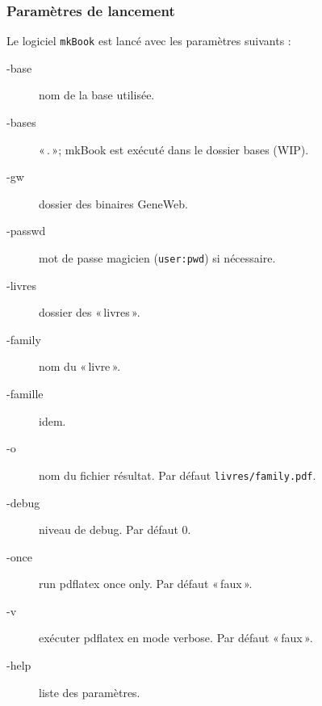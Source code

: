 \subsubsection{Paramètres de lancement}

Le logiciel \verb|mkBook| est lancé avec les paramètres suivants :
\begin{description}
\item[-base] nom de la base utilisée.
\item[-bases] «\,.\,»; mkBook est exécuté dans le dossier bases (WIP).
\item[-gw] dossier des binaires GeneWeb.
\item[-passwd] mot de passe magicien (\verb|user:pwd|) si nécessaire.
\item[-livres] dossier des «\,livres\,».
\item[-family] nom du «\,livre\,».
\item[-famille] idem.
\item[-o] nom du fichier résultat. Par défaut \verb|livres/family.pdf|.
\item[-debug] niveau de debug. Par défaut 0.
\item[-once] run pdflatex once only. Par défaut «\,faux\,».
\item[-v] exécuter pdflatex en mode verbose. Par défaut «\,faux\,».
\item[-help] liste des paramètres.
\end{description}

